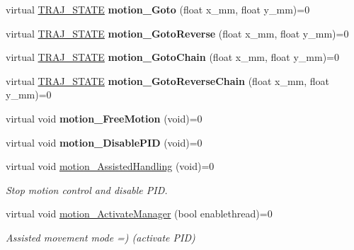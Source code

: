 \begin{DoxyCompactItemize}
virtual \hyperlink{path__manager_8h_adb3360abeb29758da93865c8afcb80eb}{T\+R\+A\+J\+\_\+\+S\+T\+A\+TE} {\bfseries motion\+\_\+\+Goto} (float x\+\_\+mm, float y\+\_\+mm)=0
\item 
\mbox{\label{classAAsservDriver_a19b77ce59325a7c6c5f65eac3d9c7593}} 
virtual \hyperlink{path__manager_8h_adb3360abeb29758da93865c8afcb80eb}{T\+R\+A\+J\+\_\+\+S\+T\+A\+TE} {\bfseries motion\+\_\+\+Goto\+Reverse} (float x\+\_\+mm, float y\+\_\+mm)=0
\item 
\mbox{\label{classAAsservDriver_ab8a6a390e76b8999c59a28c2e8190106}} 
virtual \hyperlink{path__manager_8h_adb3360abeb29758da93865c8afcb80eb}{T\+R\+A\+J\+\_\+\+S\+T\+A\+TE} {\bfseries motion\+\_\+\+Goto\+Chain} (float x\+\_\+mm, float y\+\_\+mm)=0
\item 
\mbox{\label{classAAsservDriver_afa0de8f03c96e899d5339d394295c560}} 
virtual \hyperlink{path__manager_8h_adb3360abeb29758da93865c8afcb80eb}{T\+R\+A\+J\+\_\+\+S\+T\+A\+TE} {\bfseries motion\+\_\+\+Goto\+Reverse\+Chain} (float x\+\_\+mm, float y\+\_\+mm)=0
\item 
\mbox{\label{classAAsservDriver_aca4741e0e7e11947180f53ba8abe0730}} 
virtual void {\bfseries motion\+\_\+\+Free\+Motion} (void)=0
\item 
\mbox{\label{classAAsservDriver_a3d4f4d2a80ee1887212f38fda3094c26}} 
virtual void {\bfseries motion\+\_\+\+Disable\+P\+ID} (void)=0
\item 
\mbox{\label{classAAsservDriver_a83153736da05eba6451f02b399eb4438}} 
virtual void \hyperlink{classAAsservDriver_a83153736da05eba6451f02b399eb4438}{motion\+\_\+\+Assisted\+Handling} (void)=0
\begin{DoxyCompactList}\small\item\em Stop motion control and disable P\+ID. \end{DoxyCompactList}\item 
\mbox{\label{classAAsservDriver_a046eb790d147ad8ec34bcd9565ad675b}} 
virtual void \hyperlink{classAAsservDriver_a046eb790d147ad8ec34bcd9565ad675b}{motion\+\_\+\+Activate\+Manager} (bool enablethread)=0
\begin{DoxyCompactList}\small\item\em Assisted movement mode =) (activate P\+ID) \end{DoxyCompactList}\item 

\end{DoxyCompactItemize}
